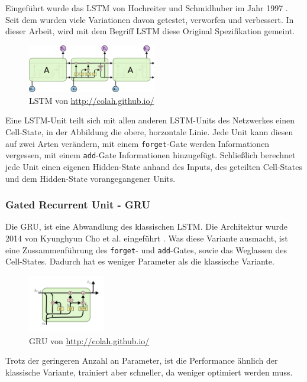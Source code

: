 \documentclass[pdftex,a4paper,halfparskip, article]{scrartcl}
\begin{document}
Eingeführt wurde das LSTM von Hochreiter und Schmidhuber im Jahr 1997 \cite{LSTM_orig}. Seit dem wurden viele Variationen davon getestet, verworfen und verbessert. In dieser Arbeit, wird mit dem Begriff LSTM diese Original Spezifikation gemeint.

\begin{figure}[h]
\centering
\includegraphics[width=0.5\textwidth]{colah_lstm}
\caption{LSTM von \url{http://colah.github.io/}}
\end{figure}

Eine LSTM-Unit teilt sich mit allen anderen LSTM-Units des Netzwerkes einen Cell-State, in der Abbildung die obere, horzontale Linie. Jede Unit kann diesen auf zwei Arten verändern, mit einem \texttt{forget}-Gate werden Informationen vergessen, mit einem \texttt{add}-Gate Informationen hinzugefügt. Schließlich berechnet jede Unit einen eigenen Hidden-State anhand des Inputs, des geteilten Cell-States und dem Hidden-State vorangegangener Units.


\subsubsection{Gated Recurrent Unit - GRU}

Die GRU, ist eine Abwandlung des klassischen LSTM. Die Architektur wurde 2014 von Kyunghyun Cho et al. eingeführt \cite{DBLP:journals/corr/ChoMGBSB14}. Was diese Variante ausmacht, ist eine Zussammenführung des \texttt{forget}- und \texttt{add}-Gates, sowie das Weglassen des Cell-States. Dadurch hat es weniger Parameter als die klassische Variante.
\begin{figure}[h]
\centering
\includegraphics[width=0.3\textwidth]{colah_gru_small}
\caption{GRU von \url{http://colah.github.io/}}
\end{figure}
Trotz der geringeren Anzahl an Parameter, ist die Performance ähnlich der klassische Variante\cite{lstmSearchSpace}, trainiert aber schneller, da weniger optimiert werden muss. 
\end{document}
